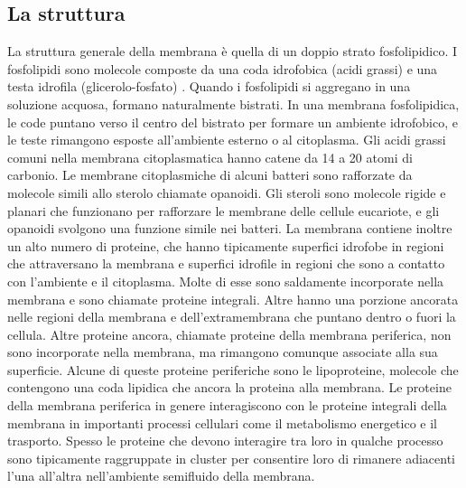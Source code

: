 \subsection{La struttura}
La struttura generale della membrana è quella di un doppio strato fosfolipidico. I fosfolipidi sono molecole composte da una coda idrofobica (acidi grassi) e una testa idrofila 
(glicerolo-fosfato) .
Quando i fosfolipidi si aggregano in una soluzione acquosa, formano naturalmente bistrati. In una membrana 
fosfolipidica, le code puntano verso il centro del bistrato per formare un ambiente idrofobico, e le teste rimangono esposte 
all'ambiente esterno o al citoplasma. Gli acidi grassi comuni nella membrana citoplasmatica hanno catene da  14 a 20 atomi di carbonio.
Le membrane citoplasmiche di alcuni batteri sono rafforzate da molecole simili allo sterolo chiamate opanoidi. Gli steroli sono molecole rigide e planari 
che funzionano per rafforzare le membrane delle cellule eucariote, e gli opanoidi svolgono una funzione simile nei batteri.
La membrana contiene inoltre un alto numero di proteine, che hanno tipicamente superfici idrofobe in regioni che attraversano la membrana e superfici 
idrofile in regioni che sono a contatto con l'ambiente e il citoplasma. Molte di esse sono saldamente incorporate nella membrana e sono chiamate proteine 
integrali. Altre hanno una porzione ancorata nelle regioni della membrana e dell'extramembrana che puntano dentro o fuori la cellula. Altre proteine ancora, 
chiamate proteine della membrana periferica, non sono incorporate nella membrana, ma rimangono comunque associate alla sua superficie. Alcune di queste 
proteine periferiche sono le lipoproteine, molecole che contengono una coda lipidica che ancora la proteina alla membrana. Le proteine della membrana 
periferica in genere interagiscono con le proteine integrali della membrana in importanti processi cellulari come il metabolismo energetico e il trasporto. 
Spesso le proteine che devono interagire tra loro in qualche processo sono tipicamente raggruppate in cluster per consentire loro di rimanere adiacenti 
l'una all'altra nell'ambiente semifluido della  membrana.
